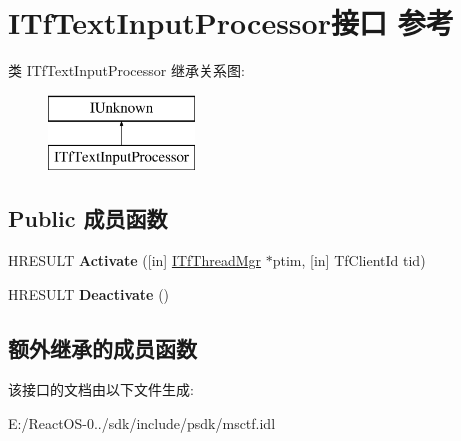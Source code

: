 \hypertarget{interface_i_tf_text_input_processor}{}\section{I\+Tf\+Text\+Input\+Processor接口 参考}
\label{interface_i_tf_text_input_processor}
类 I\+Tf\+Text\+Input\+Processor 继承关系图\+:\begin{figure}[H]
\begin{center}
\leavevmode
\includegraphics[height=2.000000cm]{interface_i_tf_text_input_processor}
\end{center}
\end{figure}
\subsection*{Public 成员函数}
\begin{DoxyCompactItemize}
\item 
\mbox{\label{interface_i_tf_text_input_processor_a8d5006e43f45b74b29be4d9a5f461187}} 
H\+R\+E\+S\+U\+LT {\bfseries Activate} (\mbox{[}in\mbox{]} \hyperlink{interface_i_tf_thread_mgr}{I\+Tf\+Thread\+Mgr} $\ast$ptim, \mbox{[}in\mbox{]} Tf\+Client\+Id tid)
\item 
\mbox{\label{interface_i_tf_text_input_processor_a6391a6dbcf90fc00aca7ca42957535c1}} 
H\+R\+E\+S\+U\+LT {\bfseries Deactivate} ()
\end{DoxyCompactItemize}
\subsection*{额外继承的成员函数}


该接口的文档由以下文件生成\+:\begin{DoxyCompactItemize}
\item 
E\+:/\+React\+O\+S-\/0../sdk/include/psdk/msctf.\+idl\end{DoxyCompactItemize}
